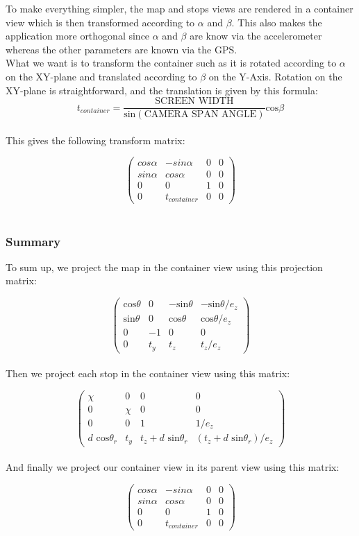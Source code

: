To make everything simpler, the map and stops views are rendered in a container view which is then transformed according to $\alpha$ and $\beta$. This also makes the application more orthogonal since $\alpha$ and $\beta$ are know via the accelerometer whereas the other parameters are known via the GPS.\\

What we want is to transform the container such as it is rotated according to $\alpha$ on the XY-plane and translated according to $\beta$ on the Y-Axis. Rotation on the XY-plane is straightforward, and the translation is given by this formula:\\

\[t_{container} = \frac{\textrm{SCREEN WIDTH}}{\textrm{sin}(\textrm{CAMERA SPAN ANGLE})} \textrm{cos}\beta\]\\

This gives the following transform matrix:

\[\left( \begin{array}{cccc}
	cos \alpha				& -sin \alpha 			& 0 						& 0\\
	sin \alpha 				& cos \alpha			& 0 						& 0\\
	0					& 0					& 1						& 0\\
	0					& t_{container}			& 0						& 0
\end{array} \right)\]\\

\subsubsection{Summary}

To sum up, we project the map in the container view using this projection matrix:

\[ \left( \begin{array}{cccc}
	\textrm{cos} \theta	& 0 				& -\textrm{sin} \theta 	& - \textrm{sin} \theta / e_z\\
	\textrm{sin} \theta 	& 0				& \textrm{cos} \theta 		& \textrm{cos} \theta  / e_z\\
	0				& -1				& 0					& 0\\
	0				& t_y				& t_z 				& t_z / e_z
\end{array} \right)\]\\

Then we project each stop in the container view using this matrix:

\[\left( \begin{array}{cccc}
	\chi					& 0 					& 0 						& 0\\
	0 					& \chi				& 0 						& 0\\
	0					& 0					& 1						& 1/e_z\\
	d \textrm{ cos}\theta_r	& t_y					& t_z + d \textrm{ sin}\theta_r	& (t_z + d \textrm{ sin}\theta_r) / e_z
\end{array} \right)\]\\

And finally we project our container view in its parent view using this matrix:

\[ \left( \begin{array}{cccc}
	cos \alpha				& -sin \alpha 			& 0 						& 0\\
	sin \alpha 				& cos \alpha			& 0 						& 0\\
	0					& 0					& 1						& 0\\
	0					& t_{container}			& 0						& 0
\end{array} \right)\]\\
